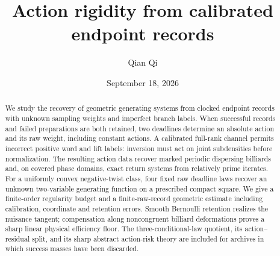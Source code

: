 
\usepackage{array}
\raggedbottom
{}
\title[Action rigidity from calibrated endpoint records]{Action rigidity from calibrated endpoint records}
\author{Qian Qi}
\date{September 18, 2026}

\begin{abstract}
We study the recovery of geometric generating systems from clocked
endpoint records with unknown sampling weights and imperfect branch
labels.  When successful records and failed preparations are both
retained, two deadlines determine an absolute action and its raw weight,
including constant actions.  A calibrated full-rank channel permits
incorrect positive word and lift labels: inversion must act on joint
subdensities before normalization.  The resulting action data recover
marked periodic dispersing billiards and, on covered phase domains,
exact return systems from relatively prime iterates.  For a uniformly
convex negative-twist class, four fixed raw deadline laws recover an
unknown two-variable generating function on a prescribed compact square.
We give a finite-order regularity budget and a finite-raw-record
geometric estimate including calibration, coordinate and retention
errors.  Smooth Bernoulli retention realizes the nuisance tangent;
compensation along noncongruent billiard deformations proves a sharp
linear physical efficiency floor.  The three-conditional-law quotient,
its action--residual split, and its sharp abstract action-risk theory
are included for archives in which success masses have been discarded.
\end{abstract}
\maketitle
\setcounter{tocdepth}{1}
\tableofcontents





















